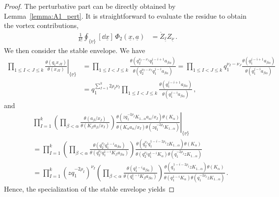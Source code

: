 \begin{proof}
The perturbative part can be directly obtained by Lemma~\ref{lemma:A1_pert}.
It is straightforward to evaluate the residue to obtain the vortex contributions,
\begin{align}
    \frac{1}{k!} \oint_{\{ \underline{\nu} \}} [\dd{\underline{x}}] \, \Phi_{2}(\underline{x},\underline{a})
    & = \mathring{Z}_{\underline{\ell}} Z_{\underline{\nu}}  
    \, .
\end{align}
We then consider the stable envelope.
We have
\begin{align}
    \left.\prod_{1 \le I<J \le k} \frac{\theta(q_1 x_{JI})}{\theta(x_{JI})}\right|_{\{\underline{\nu}\}}
    & = \prod_{1 \le I<J \le k} \frac{\theta(q_2^{\nu_{I} - \nu_{J}} q_1^{j-i+1} a_{\beta\alpha})}{\theta(q_2^{\nu_{I} - \nu_{J}} q_1^{j-i} a_{\beta\alpha})} = \prod_{1 \le I < J \le k} q_1^{\nu_{I} - \nu_{J}} \frac{\theta(q_1^{j-i+1} a_{\beta\alpha})}{\theta(q_1^{j-i} a_{\beta\alpha})}
    \nonumber \\
    & = 
    q_1^{\sum_{I=1}^k 2 \rho_I \nu_I} \prod_{1 \le I < J \le k} \frac{\theta(q_1^{j-i+1} a_{\beta\alpha})}{\theta(q_1^{j-i} a_{\beta\alpha})}
    \, ,
\end{align}
and 
\begin{align}
    &
    \left.\prod_{I=1}^k \left(
    \prod_{\beta < \alpha} \frac{\theta(a_\beta/x_I)}{\theta(K_\beta a_\beta/x_I)}
    \right)
    \frac{\theta(z q_1^{-2\rho_I} K_{1\ldots \alpha} a_{\alpha} / x_I) \theta(K_{\alpha})}{\theta(K_{\alpha} a_{\alpha} / x_I) \theta(z q_1^{-2\rho_I} K_{1\ldots \alpha})}
    \right|_{\{\underline{\nu}\}}
    \nonumber \\
    & =
    \prod_{I=1}^k \left( \prod_{\beta < \alpha} \frac{\theta(q_2^{\nu_{I}} q_1^{1-i} a_{\beta\alpha})}{\theta(q_2^{\nu_{I}} q_1^{1-i} K_\beta a_{\beta\alpha})}
    \right)
    \frac{\theta(q_2^{\nu_{I}} q_1^{1-i-2\rho_I} z K_{1\ldots \alpha}) \theta(K_{\alpha})}{\theta(q_2^{\nu_{I}} q_1^{1-i} K_{\alpha}) \theta(q_1^{-2\rho_I} z K_{1\ldots \alpha})}
    \nonumber \\
    & =
    \prod_{I=1}^k \left( z q_1^{-2\rho_I} \right)^{\nu_{I}}
    \left(
    \prod_{\beta < \alpha} \frac{\theta(q_1^{1-i} a_{\beta\alpha})}{\theta(q_1^{1-i} K_\beta a_{\beta\alpha})}
    \right)
    \frac{\theta(q_1^{1-i-2\rho_I} z K_{1\ldots \alpha}) \theta(K_{\alpha})}{\theta(q_1^{1-i} K_{\alpha}) \theta(q_1^{-2\rho_I} z K_{1\ldots \alpha})}
    \, .
\end{align}
Hence, the specialization of the stable envelope yields

\end{proof}
